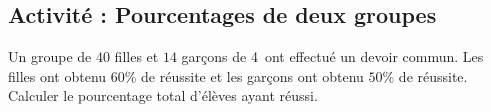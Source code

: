 
\subsection*{Activité : Pourcentages de deux groupes}

Un groupe de $40$ filles et \( 14\) garçons de 4\ieme\ ont effectué un devoir commun. Les filles ont obtenu $60$\% de réussite et les garçons ont obtenu $50$\% de réussite. Calculer le pourcentage total d'élèves ayant réussi.
